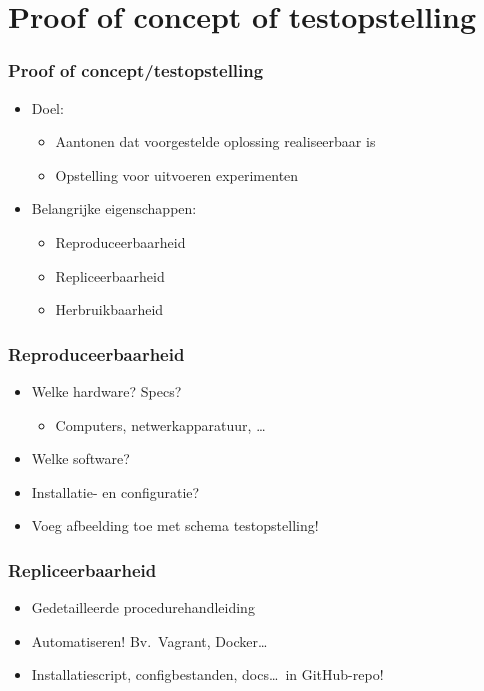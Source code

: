 \documentclass[aspectratio=169]{beamer}
\begin{document}
\section{Proof of concept of testopstelling}

\begin{frame}
  \frametitle{Proof of concept/testopstelling}

  \begin{itemize}
    \item Doel:
          \begin{itemize}
            \item Aantonen dat voorgestelde oplossing realiseerbaar is
            \item Opstelling voor uitvoeren experimenten
          \end{itemize}
    \item Belangrijke eigenschappen:
          \begin{itemize}
            \item Reproduceerbaarheid
            \item Repliceerbaarheid
            \item Herbruikbaarheid
          \end{itemize}
  \end{itemize}

\end{frame}

\begin{frame}
  \frametitle{Reproduceerbaarheid}


  \bigskip

  \begin{itemize}
    \item Welke hardware? Specs?
          \begin{itemize}
            \item Computers, netwerkapparatuur, \ldots
          \end{itemize}
    \item Welke software?
    \item Installatie- en configuratie?
    \item Voeg afbeelding toe met schema testopstelling!
  \end{itemize}

\end{frame}

\begin{frame}
  \frametitle{Repliceerbaarheid}


  \bigskip

  \begin{itemize}
    \item Gedetailleerde procedurehandleiding
    \item Automatiseren! Bv.\ Vagrant, Docker\ldots
    \item Installatiescript, configbestanden, docs\ldots\ in GitHub-repo!
  \end{itemize}

\end{frame}
\end{document}
